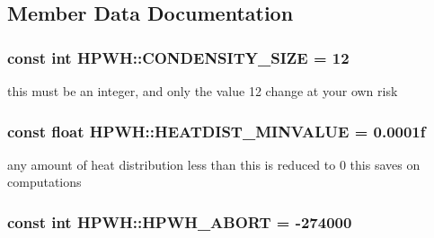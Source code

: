 \subsection{Member Data Documentation}
\hypertarget{class_h_p_w_h_a545073febf9422e346d62d27093b8eb8}{
\subsubsection[{C\-O\-N\-D\-E\-N\-S\-I\-T\-Y\-\_\-\-S\-I\-Z\-E}]{\setlength{\rightskip}{0pt plus 5cm}const int H\-P\-W\-H\-::\-C\-O\-N\-D\-E\-N\-S\-I\-T\-Y\-\_\-\-S\-I\-Z\-E = 12\hspace{0.3cm}{\ttfamily [static]}}}\label{class_h_p_w_h_a545073febf9422e346d62d27093b8eb8}
this must be an integer, and only the value 12 change at your own risk \hypertarget{class_h_p_w_h_a17bd9d54d4aa54393078e4be104675dd}{
\subsubsection[{H\-E\-A\-T\-D\-I\-S\-T\-\_\-\-M\-I\-N\-V\-A\-L\-U\-E}]{\setlength{\rightskip}{0pt plus 5cm}const float H\-P\-W\-H\-::\-H\-E\-A\-T\-D\-I\-S\-T\-\_\-\-M\-I\-N\-V\-A\-L\-U\-E = 0.\-0001f\hspace{0.3cm}{\ttfamily [static]}}}\label{class_h_p_w_h_a17bd9d54d4aa54393078e4be104675dd}
any amount of heat distribution less than this is reduced to 0 this saves on computations \hypertarget{class_h_p_w_h_a727a9e272cf7ac3564ebd67bfb8ed063}{
\subsubsection[{H\-P\-W\-H\-\_\-\-A\-B\-O\-R\-T}]{\setlength{\rightskip}{0pt plus 5cm}const int H\-P\-W\-H\-::\-H\-P\-W\-H\-\_\-\-A\-B\-O\-R\-T = -\/274000\hspace{0.3cm}{\ttfamily [static]}}}\label{class_h_p_w_h_a727a9e272cf7ac3564ebd67bfb8ed063}
